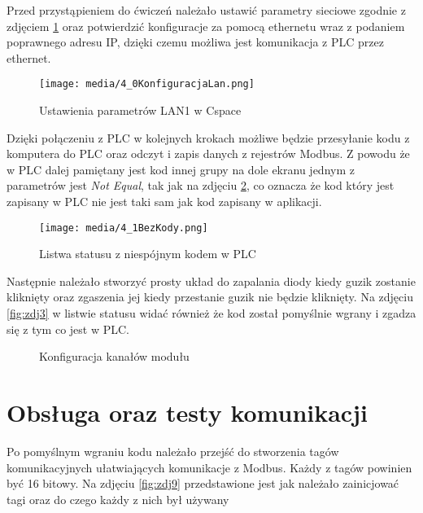 \documentclass{article}
\begin{document}
Przed przystąpieniem do ćwiczeń należało ustawić parametry sieciowe zgodnie z zdjęciem \ref{fig:zdj1} oraz potwierdzić konfiguracje za pomocą ethernetu wraz z podaniem poprawnego adresu IP, dzięki czemu możliwa jest komunikacja z PLC przez ethernet.
\begin{figure}[H]
    \centering
    \texttt{[image: media/4\_0KonfiguracjaLan.png]}
    \caption{Ustawienia parametrów LAN1 w Cspace}
    \label{fig:zdj1}
\end{figure}

Dzięki połączeniu z PLC w kolejnych krokach możliwe będzie przesyłanie kodu z komputera do PLC oraz odczyt i zapis danych z rejestrów Modbus. Z powodu że w PLC dalej pamiętany jest kod innej grupy na dole ekranu jednym z parametrów jest \textit{Not Equal}, tak jak na zdjęciu \ref{fig:zdj2}, co oznacza że kod który jest zapisany w PLC nie jest taki sam jak kod zapisany w aplikacji.
\begin{figure}[H]
    \centering
    \texttt{[image: media/4\_1BezKody.png]}
    \caption{Listwa statusu z niespójnym kodem w PLC}
    \label{fig:zdj2}
\end{figure}

\newpage
Następnie należało stworzyć prosty układ do zapalania diody kiedy guzik zostanie kliknięty oraz zgaszenia jej kiedy przestanie guzik nie będzie kliknięty. Na zdjęciu \ref{fig:zdj3} w listwie statusu widać również że kod został pomyślnie wgrany i zgadza się z tym co jest w PLC.

\begin{figure}[!ht]
    \centering
   
        \hfill
    \caption{Konfiguracja kanałów modułu}
    \label{fig:main1}
\end{figure}


\newpage
\section{Obsługa oraz testy komunikacji}
Po pomyślnym wgraniu kodu należało przejść do stworzenia tagów komunikacyjnych ułatwiających komunikacje z Modbus. Każdy z tagów powinien być 16 bitowy. Na zdjęciu \ref{fig:zdj9} przedstawione jest jak należało zainicjować tagi oraz do czego każdy z nich był używany
\end{document}
